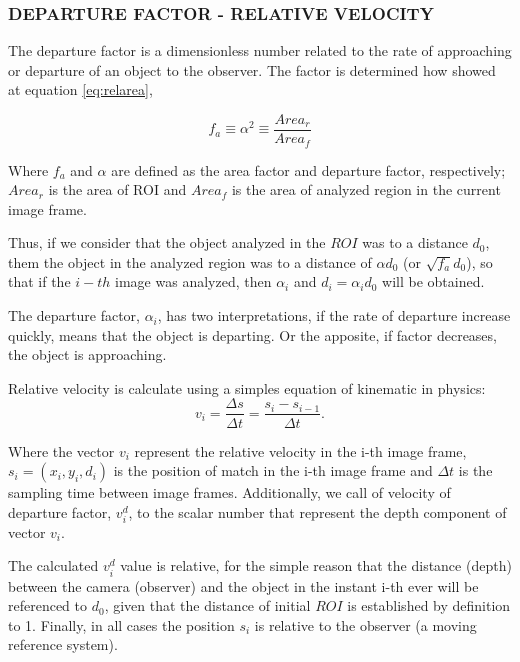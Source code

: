 
\subsubsection{DEPARTURE FACTOR - RELATIVE VELOCITY}
The departure factor is a dimensionless number related to the rate of approaching 
or departure of an object to the observer. The factor
is determined how showed at equation \ref{eq:relarea},

\begin{equation}\label{eq:relarea}
f_a \equiv \alpha^2 \equiv \frac{Area_r}{Area_f} 
\end{equation}

Where $f_a$ and $\alpha$ are defined as the area factor and departure factor, 
respectively; $Area_r$ is the area of ROI and $Area_f$ 
is the area of analyzed region in the current image frame. 

Thus, if we consider that the object analyzed in the $ROI$ was to a distance $d_0$,
them the object in the analyzed region was to a distance of $\alpha d_0$ (or $\sqrt{f_a} d_0$),
so that if the $i-th$ image was analyzed, then $\alpha_i$ and $d_i=\alpha_i d_0$ will be obtained.

The departure factor, $\alpha_i$, has two interpretations, if the rate of departure increase quickly, 
means that the object is departing. Or the apposite, if factor decreases, the 
object is approaching.

Relative velocity is calculate using a simples equation of kinematic in physics:
\begin{equation}
 v_i = \frac{\Delta s}{\Delta t}= \frac{s_i-s_{i-1}}{\Delta t}.
\end{equation}

Where the vector $v_i$ represent the relative velocity in the i-th image frame, 
$s_i=(x_i,y_i,d_i)$ is the position of match in the i-th image frame
and $\Delta t$ is the sampling time between image frames.
Additionally, we call of velocity of departure factor, $v^d_i$, 
to the scalar number that represent the depth component
of vector $v_i$.

The calculated  $v^d_i$ value is relative, for the simple reason that the distance (depth) between the 
camera (observer) and the object in the instant i-th ever will be referenced to $d_0$, 
given that the distance of initial $ROI$ is established by definition to 1.
Finally, in all cases the position $s_i$ is relative to the observer (a moving reference system).


